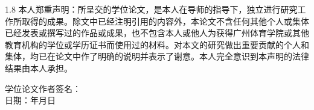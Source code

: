 
\thispagestyle{empty}
\vspace*{2cm}

\begin{center}
\heiti{}
\end{center}

\vspace{1.5cm}

\begin{center}
\heiti{}
\end{center}

\vspace{1cm}

\begin{spacing}{1.8}
\noindent
本人郑重声明：所呈交的学位论文，是本人在导师的指导下，独立进行研究工作所取得的成果。除文中已经注明引用的内容外，本论文不含任何其他个人或集体已经发表或撰写过的作品或成果，也不包含本人或他人为获得广州体育学院或其他教育机构的学位或学历证书而使用过的材料。对本文的研究做出重要贡献的个人和集体，均已在论文中作了明确的说明并表示了谢意。本人完全意识到本声明的法律结果由本人承担。

\vspace{1.5cm}

\begin{flushright}
学位论文作者签名：\underline{\hspace{4cm}}\\[0.8cm]
日期：\underline{\hspace{4cm}}年\underline{\hspace{2cm}}月\underline{\hspace{2cm}}日
\end{flushright}
\end{spacing}

\newpage
\thispagestyle{empty}
\vspace*{2cm}

\begin{center}
\heiti{}
\end{center}

\vspace{1cm}

